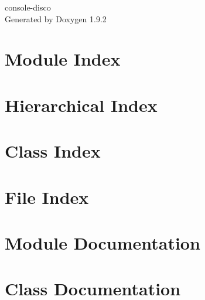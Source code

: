\documentclass[twoside]{book}
\newcommand{\+}{\discretionary{\mbox{\scriptsize$\hookleftarrow$}}{}{}}
\newcommand{\clearemptydoublepage}{%
    \newpage{\pagestyle{empty}\cleardoublepage}%
  }
\begin{document}
  \raggedbottom
    \hypersetup{pageanchor=false,
                bookmarksnumbered=true,
                pdfencoding=unicode
               }
  \begin{titlepage}
  \vspace*{7cm}
  \begin{center}%
  {\Large console-\/disco}\\
  \vspace*{1cm}
  {\large Generated by Doxygen 1.9.2}\\
  \end{center}
  \end{titlepage}
  \clearemptydoublepage
  \tableofcontents
  \clearemptydoublepage
  \hypersetup{pageanchor=true}
\chapter{Module Index}

\chapter{Hierarchical Index}

\chapter{Class Index}

\chapter{File Index}

\chapter{Module Documentation}






\chapter{Class Documentation}
























\end{document}
